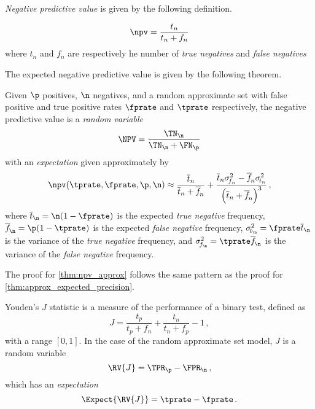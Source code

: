 \documentclass[ ../main.tex]{subfiles}
\begin{document}
\emph{Negative predictive value} is given by the following definition.
\begin{definition}
	\begin{equation}
	\npv = \frac{t_n}{t_n + f_n}
	\end{equation}
	where $t_n$ and $f_n$ are respectively he number of \emph{true negatives} 
	and \emph{false negatives} 
\end{definition}
The expected negative predictive value is given by the following theorem.
\begin{theorem}
	\label{thm:npv_approx}
	Given $\p$ positives, $\n$ negatives, and a random approximate set with false positive and true positive rates $\fprate$ and $\tprate$ respectively, the negative predictive value is a \emph{random variable}
	\begin{equation}
	\NPV = \frac{\TN_{\n}}{\TN_{\n} + \FN_{\p}}
	\end{equation}
	with an \emph{expectation} given approximately by
	\begin{equation}
	\label{eq:npv_approx}
	\npv(\tprate, \fprate , \p, \n) \approx 
	\frac{\overline{t}_n}{\overline{t}_n + \overline{f}_{\!n}} +
	\frac{\overline{t}_n \sigma_{\!f_n}^2 - \overline{f}_{\!n} 
		\sigma_{\!t_n}^2}{\left(\overline{t}_n + \overline{f}_{\!n}\right)^3}\,,
	\end{equation}
	where $\overline{t}_\n = \n(1-\fprate)$ is the expected \emph{true negative} frequency, $\overline{f}_{\!\n} =  \p(1-\tprate)$ is the expected \emph{false negative} frequency, $\sigma_{\!t_\n}^2 = \fprate \overline{t}_\n$ is the variance of the \emph{true negative} frequency, and $\sigma_{\!f_\n}^2 = \tprate\overline{f}_{\!\n}$ is the variance of the \emph{false negative} frequency.
\end{theorem}
The proof for \cref{thm:npv_approx} follows the same pattern as the proof for \cref{thm:approx_expected_precision}.

Youden's $J$ statistic is a measure of the performance of a binary test, defined as
\begin{equation}
J = \frac{t_p}{t_p + f_n} + \frac{t_n}{t_n + f_p} - 1\,,
\end{equation}
with a range $[0,1]$.
In the case of the random approximate set model, $J$ is a random variable
\begin{equation}
\RV{J} = \TPR_\p - \FPR_\n\,,
\end{equation}
which has an \emph{expectation}
\begin{equation}
\Expect{\RV{J}} = \tprate - \fprate\,.
\end{equation}
\end{document}
